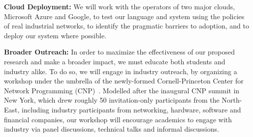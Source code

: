 \noindent
{\bf Cloud Deployment:}  We will work with the operators of two major clouds, Microsoft Azure and Google, to test our language and system using the policies of real industrial networks, to identify the pragmatic barriers to adoption, and to deploy our system where possible. 

\noindent
{\bf Broader Outreach:}  
In order to maximize the effectiveness of our proposed research and make a broader
impact, we must educate both students and industry alike.  To do so,
we will engage in industry outreach, by organizing a workshop under
the umbrella of the newly-formed
Cornell-Princeton Center for Network Programming (CNP)~\cite{center-for-network-programming}.
Modelled after the inaugural CNP summit in New York, which drew roughly 50
invitation-only participants from the North-East, including industry participants
from networking, hardware, software and financial companies, our workshop will 
encourage academics to engage with industry via panel
discussions, technical talks and informal discussions.  


